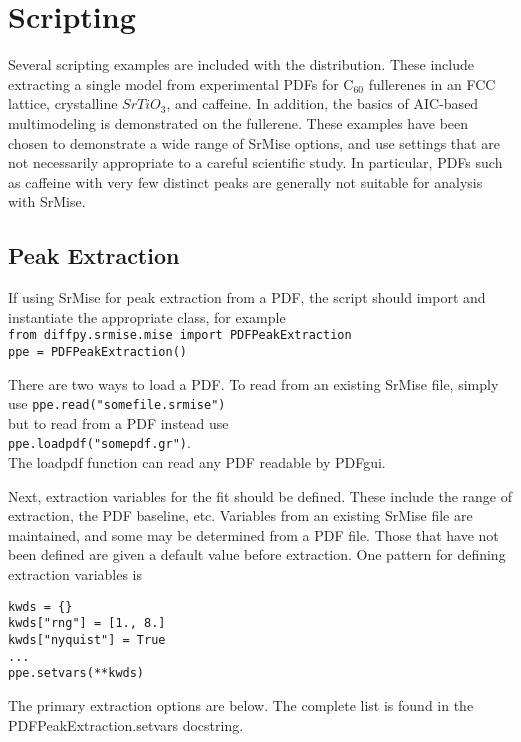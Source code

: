 \documentclass[12pt]{article}
\newcommand{\aic}{\ensuremath{\mathrm{AIC}}}
\newcommand{\Csixty}{\ensuremath{\textrm{C}_{60}}}
\begin{document}
\section{Scripting}

Several scripting examples are included with the distribution.  These include extracting a single model from experimental PDFs for $\Csixty$ fullerenes in an FCC lattice, crystalline $SrTiO_3$, and caffeine.  In addition, the basics of \aic-based multimodeling is demonstrated on the fullerene.  These examples have been chosen to demonstrate a wide range of {\sc SrMise} options, and use settings that are not necessarily appropriate to a careful scientific study. In particular, PDFs such as caffeine with very few distinct peaks are generally not suitable for analysis with {\sc SrMise}.

\subsection{Peak Extraction}

If using {\sc SrMise} for peak extraction from a PDF, the script should import and instantiate the appropriate class, for example\\
\texttt{from diffpy.srmise.mise import PDFPeakExtraction}\\
\texttt{ppe = PDFPeakExtraction()}

There are two ways to load a PDF.  To read from an existing {\sc SrMise} file, simply use
\texttt{ppe.read("somefile.srmise")}\\
but to read from a PDF instead use\\
\texttt{ppe.loadpdf("somepdf.gr")}.\\
The loadpdf function can read any PDF readable by PDFgui.

Next, extraction variables for the fit should be defined.  These include the range of extraction, the PDF baseline, etc.  Variables from an existing {\sc SrMise} file are maintained, and some may be determined from a PDF file.  Those that have not been defined are given a default value before extraction.  One pattern for defining extraction variables is
\begin{verbatim}
kwds = {}
kwds["rng"] = [1., 8.]
kwds["nyquist"] = True
...
ppe.setvars(**kwds)
\end{verbatim}

The primary extraction options are below.  The complete list is found in the PDFPeakExtraction.setvars docstring.
\end{document}

